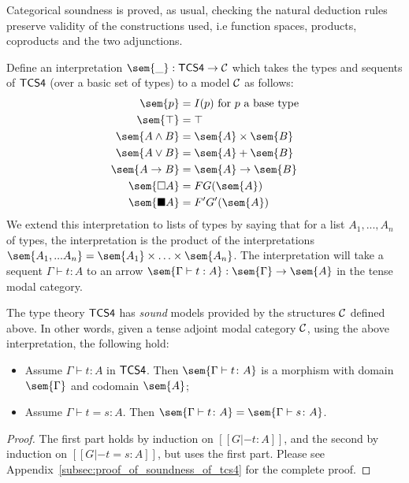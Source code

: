 Categorical soundness is proved, as usual, checking the natural
deduction rules preserve validity of the constructions used, i.e
function spaces, products, coproducts and the two adjunctions.

Define an interpretation $\sem{\_} : \sf{TCS4} \to {\cal C}$ which
takes the types and sequents of $\sf{TCS4}$ (over a basic set of
types) to a model $\cal C$ as follows:
\begin{align*}
\sem{p} &= I(p) \mbox{  for $p$ a base type}\\
\sem{\top} &= \top\\
\sem{  A \wedge B  } &=  \sem{ A}  \times  \sem{ B }\\
\sem{  A \lor B  } &=  \sem{ A}  +  \sem{ B }\\
\sem{  A \to B  } &=  \sem{ A}  \to  \sem{ B }\\
\sem{\Box A} &= F G(\sem{A})\\
\sem{\blacksquare A} &= F' G'(\sem{A})
\end{align*}
 We extend this interpretation to lists of types by saying that for a
 list $A_1, ..., A_n$ of types, the interpretation is the product of
 the interpretations $\sem{A_1,...A_n} = \sem{A_1} \times \ldots
 \times \sem{A_n}$.  The interpretation will take a sequent $\Gamma
 \vdash t : A$ to an arrow $ \sem {\Gamma \vdash t : A} : \sem{
   \Gamma} \to \sem{A} $ in the tense modal category.

\begin{theorem}
\label{thm:tcs4-csound}
The type theory $\sf{TCS4}$ has \textit{sound} models provided by the
structures $\cal C$ defined above.  In other words, given a tense
adjoint modal category $\cal C$, using the above interpretation, the
following hold:
\begin{itemize}
\item Assume $\Gamma \vdash t : A$ in $\sf{TCS4}$. Then $\sem{\Gamma
  \vdash t \colon A}$ is a morphism with domain $\sem{\Gamma}$ and
  codomain $\sem{A}$;
\item Assume $\Gamma \vdash t = s \colon A$. Then $\sem{\Gamma
  \vdash t \colon A} = \sem{\Gamma \vdash s \colon A}$.
\end{itemize}
\end{theorem}
\begin{proof}
  The first part holds by induction on $[[G |- t : A]]$, and the
  second by induction on $[[G |- t = s : A]]$, but uses the first
  part.  Please see Appendix~\ref{subsec:proof_of_soundness_of_tcs4}
  for the complete proof.  
\end{proof}

